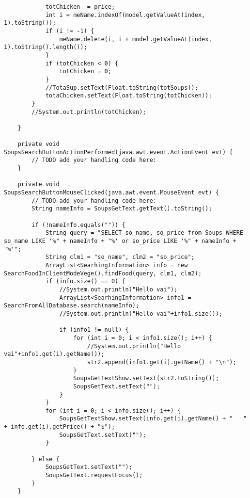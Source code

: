 \documentclass[12pt,a4paper]{article}
\begin{document}
\begin{lstlisting}
            totChicken -= price;
            int i = meName.indexOf(model.getValueAt(index, 1).toString());
            if (i != -1) {
                meName.delete(i, i + model.getValueAt(index, 1).toString().length());
            }
            if (totChicken < 0) {
                totChicken = 0;
            }
            //TotaSup.setText(Float.toString(totSoups));
            totaChicken.setText(Float.toString(totChicken));
        }
        //System.out.println(totChicken);

    }                                         

    private void SoupsSearchButtonActionPerformed(java.awt.event.ActionEvent evt) {                                                  
        // TODO add your handling code here:
    }                                                 

    private void SoupsSearchButtonMouseClicked(java.awt.event.MouseEvent evt) {                                               
        // TODO add your handling code here:
        String nameInfo = SoupsGetText.getText().toString();

        if (!nameInfo.equals("")) {
            String query = "SELECT so_name, so_price from Soups WHERE so_name LIKE '%" + nameInfo + "%' or so_price LIKE '%" + nameInfo + "%'";
            String clm1 = "so_name", clm2 = "so_price";
            ArrayList<SearhingInformation> info = new SearchFoodInClientModeVege().findFood(query, clm1, clm2);
            if (info.size() == 0) {
                //System.out.println("Hello vai");
                ArrayList<SearhingInformation> info1 = SearchFromAllDatabase.search(nameInfo);
                //System.out.println("Hello vai"+info1.size());

                if (info1 != null) {
                    for (int i = 0; i < info1.size(); i++) {
                        //System.out.println("Hello vai"+info1.get(i).getName());
                        str2.append(info1.get(i).getName() + "\n");
                    }
                    SoupsGetTextShow.setText(str2.toString());
                    SoupsGetText.setText("");
                }
            }
            for (int i = 0; i < info.size(); i++) {
                SoupsGetTextShow.setText(info.get(i).getName() + "   " + info.get(i).getPrice() + "$");
                SoupsGetText.setText("");
            }

        } else {
            SoupsGetText.setText("");
            SoupsGetText.requestFocus();
        }
    }                                              


\end{lstlisting}
\end{document}
